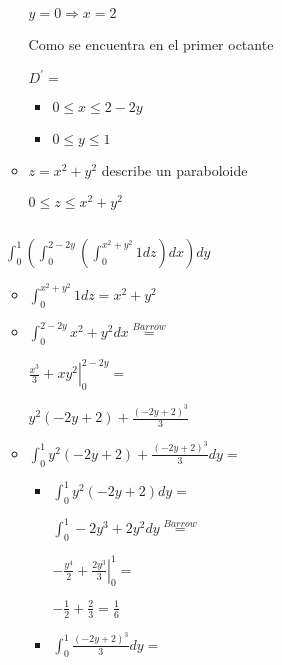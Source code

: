 \documentclass[../parcial.tex]{subfiles}
\begin{document}
\begin{enumerate}
\begin{itemize}
                    $ y = 0 \Rightarrow x = 2$

                    Como se encuentra en el primer octante

                    $D^{\prime} = $\begin{itemize}
                        \item $0 \leq x \leq 2 - 2y$
                        \item $0 \leq y \leq 1 $
                    \end{itemize}

                \item $ z = x^2 + y^2 $ describe un paraboloide
                
                    $0 \leq z \leq x^2 + y^2$

            \end{itemize}

            $ $

            $\int_0^1( \int_0^{2-2y} (\int_0^{x^2+y^2} 1 dz) dx)dy $

            \begin{itemize}
                \item $\int_0^{x^2+y^2} 1 dz = x^2+y^2 $

                \item $ \int_0^{2-2y} x^2+y^2 dx \stackrel{Barrow}{=} $

                    $\left. \frac{x^3}{3} + xy^2 \right |_0^{2-2y} = $

                    $ y^2\left(-2y+2\right)+\frac{\left(-2y+2\right)^3}{3} $

                \item $ \int_0^1  y^2\left(-2y+2\right) + \frac{\left(-2y+2\right)^3}{3} dy = $

                    \begin{itemize}
                        \item $\int_0^1 y^2(-2y+2) dy = $

                            $ \int_0^1 -2y^3 + 2y^2 dy \stackrel{Barrow}{=} $

                            $ \left. -\frac{y^4}{2} + \frac{2y^3}{3} \right |_0^1 = $

                            $ -\frac{1}{2} + \frac{2}{3} = \frac{1}{6} $

                        \item $ \int_0^1 \frac{\left(-2y+2\right)^3}{3} dy = $
                        

\end{itemize}
\end{itemize}
\end{enumerate}
\end{document}
